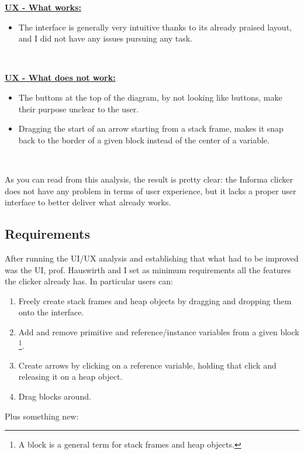 \documentclass[]{usiinfbachelorproject}
\begin{document}
\textbf{\ul{UX - What works:}}

\begin{itemize}
	\item The interface is generally very intuitive thanks to its already praised layout, and I did not have any issues pursuing any task.
\end{itemize}\

\textbf{\ul{UX - What does not work:}}

\begin{itemize}
	\item The buttons at the top of the diagram, by not looking like buttons, make their purpose unclear to the user.
	\item Dragging the start of an arrow starting from a stack frame, makes it snap back to the border of a given block instead of the center of a variable.
\end{itemize}\

\noindent As you can read from this analysis, the result is pretty clear: the Informa clicker does not have any problem in terms of user experience, but it lacks a proper user interface to better deliver what already works.

\subsection{Requirements}

After running the UI/UX analysis and establishing that what had to be improved was the UI, prof. Hauswirth and I set as minimum requirements all the features the clicker already has. In particular users can:

\begin{enumerate}
	\item Freely create stack frames and heap objects by dragging and dropping them onto the interface.
	\item Add and remove primitive and reference/instance variables from a given block \footnote{A block is a general term for stack frames and heap objects.}.
	\item Create arrows by clicking on a reference variable, holding that click and releasing it on a heap object.
	\item Drag blocks around.
\end{enumerate}

\pagebreak
\vspace{\fill}

\noindent Plus something new:
\end{document}
